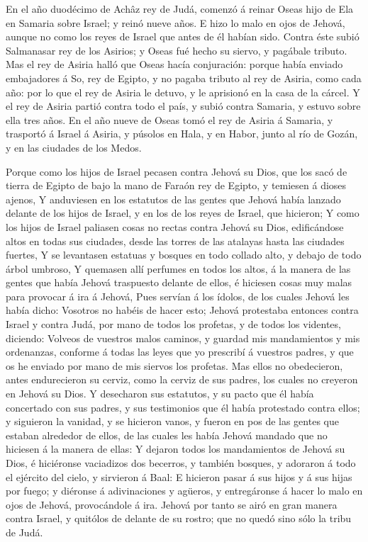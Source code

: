  En el año duodécimo de Achâz rey de Judá, comenzó á
reinar Oseas hijo de Ela en Samaria sobre Israel; y reinó nueve años.
 E hizo lo malo en ojos de Jehová, aunque no como los
reyes de Israel que antes de él habían sido.  Contra éste
subió Salmanasar rey de los Asirios; y Oseas fué hecho su siervo, y
pagábale tributo.  Mas el rey de Asiria halló que Oseas
hacía conjuración: porque había enviado embajadores á So, rey de Egipto,
y no pagaba tributo al rey de Asiria, como cada año: por lo que el rey
de Asiria le detuvo, y le aprisionó en la casa de la cárcel.
 Y el rey de Asiria partió contra todo el país, y subió
contra Samaria, y estuvo sobre ella tres años.  En el año
nueve de Oseas tomó el rey de Asiria á Samaria, y trasportó á Israel á
Asiria, y púsolos en Hala, y en Habor, junto al río de Gozán, y en las
ciudades de los Medos.

 Porque como los hijos de Israel pecasen contra Jehová su
Dios, que los sacó de tierra de Egipto de bajo la mano de Faraón rey de
Egipto, y temiesen á dioses ajenos,  Y anduviesen en los
estatutos de las gentes que Jehová había lanzado delante de los hijos de
Israel, y en los de los reyes de Israel, que hicieron;  Y
como los hijos de Israel paliasen cosas no rectas contra Jehová su Dios,
edificándose altos en todas sus ciudades, desde las torres de las
atalayas hasta las ciudades fuertes,  Y se levantasen
estatuas y bosques en todo collado alto, y debajo de todo árbol umbroso,
 Y quemasen allí perfumes en todos los altos, á la manera
de las gentes que había Jehová traspuesto delante de ellos, é hiciesen
cosas muy malas para provocar á ira á Jehová,  Pues
servían á los ídolos, de los cuales Jehová les había dicho: Vosotros no
habéis de hacer esto;  Jehová protestaba entonces contra
Israel y contra Judá, por mano de todos los profetas, y de todos los
videntes, diciendo: Volveos de vuestros malos caminos, y guardad mis
mandamientos y mis ordenanzas, conforme á todas las leyes que yo
prescribí á vuestros padres, y que os he enviado por mano de mis siervos
los profetas.  Mas ellos no obedecieron, antes
endurecieron su cerviz, como la cerviz de sus padres, los cuales no
creyeron en Jehová su Dios.  Y desecharon sus estatutos,
y su pacto que él había concertado con sus padres, y sus testimonios que
él había protestado contra ellos; y siguieron la vanidad, y se hicieron
vanos, y fueron en pos de las gentes que estaban alrededor de ellos, de
las cuales les había Jehová mandado que no hiciesen á la manera de
ellas:  Y dejaron todos los mandamientos de Jehová su
Dios, é hiciéronse vaciadizos dos becerros, y también bosques, y
adoraron á todo el ejército del cielo, y sirvieron á Baal:
 E hicieron pasar á sus hijos y á sus hijas por fuego; y
diéronse á adivinaciones y agüeros, y entregáronse á hacer lo malo en
ojos de Jehová, provocándole á ira.  Jehová por tanto se
airó en gran manera contra Israel, y quitólos de delante de su rostro;
que no quedó sino sólo la tribu de Judá.

